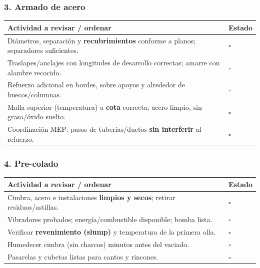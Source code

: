 \documentclass[12pt]{article}
\newcommand{\cbox}{\(\square\)}
\renewcommand{\cbox}{\(\square\)} %
\begin{document}
 \subsubsection*{3. Armado de acero}
 \begin{tabularx}{\linewidth}{>{\raggedright\arraybackslash}p{0.93\linewidth} >{\centering\arraybackslash}m{0.07\linewidth}}
 	\toprule
 	\textbf{Actividad a revisar / ordenar} & \textbf{Estado}\\
 	\midrule
 	Diámetros, separación y \textbf{recubrimientos} conforme a planos; separadores suficientes. & \cbox \\
 	Traslapes/anclajes con longitudes de desarrollo correctas; amarre con alambre recocido. & \cbox \\
 	Refuerzo adicional en bordes, sobre apoyos y alrededor de huecos/columnas. & \cbox \\
 	Malla superior (temperatura) a \textbf{cota} correcta; acero limpio, sin grasa/óxido suelto. & \cbox \\
 	Coordinación MEP: pasos de tuberías/ductos \textbf{sin interferir} al refuerzo. & \cbox \\
 	\bottomrule
 \end{tabularx}
 
 \subsubsection*{4. Pre-colado}
 \begin{tabularx}{\linewidth}{>{\raggedright\arraybackslash}p{0.93\linewidth} >{\centering\arraybackslash}m{0.07\linewidth}}
 	\toprule
 	\textbf{Actividad a revisar / ordenar} & \textbf{Estado}\\
 	\midrule
 	Cimbra, acero e instalaciones \textbf{limpios y secos}; retirar residuos/astillas. & \cbox \\
 	Vibradores probados; energía/combustible disponible; bomba lista. & \cbox \\
 	Verificar \textbf{revenimiento (slump)} y temperatura de la primera olla. & \cbox \\
 	Humedecer cimbra (sin charcos) minutos antes del vaciado. & \cbox \\
 	Pasarelas y cubetas listas para cantos y rincones. & \cbox \\
 	\bottomrule
 \end{tabularx}
 
\end{document}
